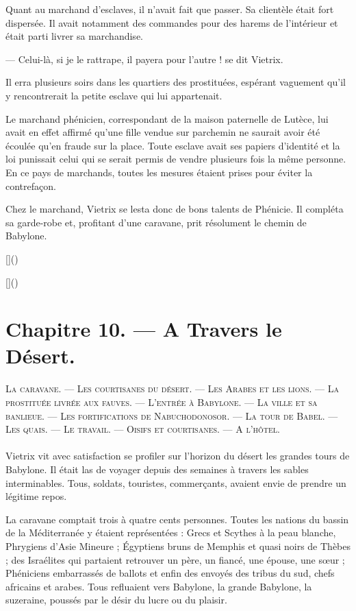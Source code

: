 \documentclass[a4paper, 11pt, oneside, polutonikogreek, french]{article}
\begin{document}
Quant au marchand d'esclaves, il n'avait fait que passer. Sa clientèle était fort dispersée. Il avait notamment des commandes pour des harems de l'intérieur et était parti livrer sa marchandise.

--- Celui-là, si je le rattrape, il payera pour l'autre ! se dit Vietrix.

Il erra plusieurs soirs dans les quartiers des prostituées, espérant vaguement qu'il y rencontrerait la petite esclave qui lui appartenait.

Le marchand phénicien, correspondant de la maison paternelle de Lutèce, lui avait en effet affirmé qu'une fille vendue sur parchemin ne saurait avoir été écoulée qu'en fraude sur la place. Toute esclave avait ses papiers d'identité et la loi punissait celui qui se serait permis de vendre plusieurs fois la même personne. En ce pays de marchands, toutes les mesures étaient prises pour éviter la contrefaçon.

Chez le marchand, Vietrix se lesta donc de bons talents de Phénicie. Il compléta sa garde-robe et, profitant d'une caravane, prit résolument le chemin de Babylone.

[]()

[]()
\clearpage
\section{Chapitre 10. --- A Travers le Désert.}
\begin{center}
\scshape
\small
La caravane. --- Les courtisanes du désert. --- Les Arabes et les lions. --- La prostituée livrée aux fauves. --- L'entrée à Babylone. --- La ville et sa banlieue. --- Les fortifications de Nabuchodonosor. --- La tour de Babel. --- Les quais. --- Le travail. --- Oisifs et courtisanes. --- A l'hôtel.
\end{center}
\paragraph{}
Vietrix vit avec satisfaction se profiler sur l'horizon du désert les grandes tours de Babylone. Il était las de voyager depuis des semaines à travers les sables interminables. Tous, soldats, touristes, commerçants, avaient envie de prendre un légitime repos.

La caravane comptait trois à quatre cents personnes. Toutes les nations du bassin de la Méditerranée y étaient représentées : Grecs et Scythes à la peau blanche, Phrygiens d'Asie Mineure ; Égyptiens bruns de Memphis et quasi noirs de Thèbes ; des Israélites qui partaient retrouver un père, un fiancé, une épouse, une sœur ; Phéniciens embarrassés de ballots et enfin des envoyés des tribus du sud, chefs africains et arabes. Tous refluaient vers Babylone, la grande Babylone, la suzeraine, poussés par le désir du lucre ou du plaisir.
\end{document}
